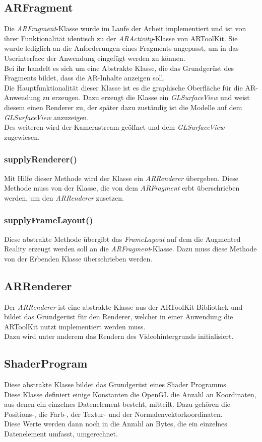 \subsection{ARFragment}
Die \textit{ARFragment}-Klasse wurde im Laufe der Arbeit implementiert und ist von ihrer Funktionalität identisch zu der \textit{ARActivity}-Klasse von ARToolKit. Sie wurde lediglich an die Anforderungen eines Fragments angepasst, um in das Userinterface der Anwendung eingefügt werden zu können.\\ 
Bei ihr handelt es sich um eine Abstrakte Klasse, die das Grundgerüst des Fragments bildet, dass die AR-Inhalte anzeigen soll.\\
Die Hauptfunktionalität dieser Klasse ist es die graphische Oberfläche für die AR-Anwendung zu erzeugen. Dazu erzeugt die Klasse ein \textit{GLSurfaceView} und weist diesem einen Renderer zu, der später dazu zuständig ist die Modelle auf dem \textit{GLSurfaceView} anzuzeigen.\\
Des weiteren wird der Kamerastream geöffnet und dem \textit{GLSurfaceView} zugewiesen.

\subsubsection{supplyRenderer()}
Mit Hilfe dieser Methode wird der Klasse ein \textit{ARRenderer} übergeben. Diese Methode muss von der Klasse, die von dem \textit{ARFragment} erbt überschrieben werden, um den \textit{ARRenderer} zusetzen.

\subsubsection{supplyFrameLayout()}
Diese abstrakte Methode übergibt das \textit{FrameLayout} auf dem die Augmented Reality erzeugt werden soll an die \textit{ARFragment}-Klasse. Dazu muss diese Methode von der Erbenden Klasse überschrieben werden.

\subsection{ARRenderer}
Der \textit{ARRenderer} ist eine abstrakte Klasse aus der ARToolKit-Bibliothek und bildet das Grundgerüst für den Renderer, welcher in einer Anwendung die ARToolKit nutzt implementiert werden muss.\\
Dazu wird unter anderem das Rendern des Videohintergrunds initialisiert.

\subsection{ShaderProgram}
Diese abstrakte Klasse bildet das Grundgerüst eines Shader Programms. \\
Diese Klasse definiert einige Konstanten die OpenGL die Anzahl an Koordinaten, aus denen ein einzelnes Datenelement besteht, mitteilt. Dazu gehören die Positions-, die Farb-, der Textur- und der Normalenvektorkoordinaten. \\
Diese Werte werden dann noch in die Anzahl an Bytes, die ein einzelnes Datenelement umfasst, umgerechnet.\\

